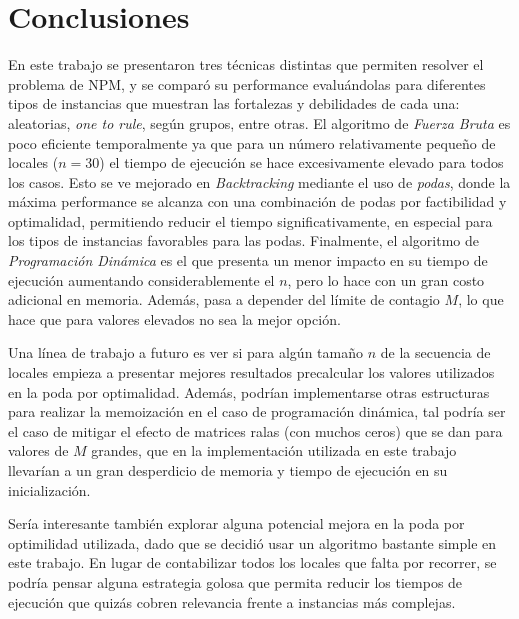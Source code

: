 \section{Conclusiones}

En este trabajo se presentaron tres técnicas distintas que permiten resolver el problema de NPM, y se comparó su performance evaluándolas para diferentes tipos de instancias que muestran las fortalezas y debilidades de cada una: aleatorias, \textit{one to rule}, según grupos, entre otras. El algoritmo de \textit{Fuerza Bruta} es poco eficiente temporalmente ya que para un número relativamente pequeño de locales ($n=30$) el tiempo de ejecución se hace excesivamente elevado para todos los casos. Esto se ve mejorado en \textit{Backtracking} mediante el uso de \textit{podas}, donde la máxima performance se alcanza con una combinación de podas por factibilidad y optimalidad, permitiendo reducir el tiempo significativamente, en especial para los tipos de instancias favorables para las podas. Finalmente, el algoritmo de \textit{Programación Dinámica} es el que presenta un menor impacto en su tiempo de ejecución aumentando considerablemente el $n$, pero lo hace con un gran costo adicional en memoria. Además, pasa a depender del límite de contagio $M$, lo que hace que para valores elevados no sea la mejor opción.

Una línea de trabajo a futuro es ver si para algún tamaño $n$ de la secuencia de locales empieza a presentar mejores resultados precalcular los valores utilizados en la poda por optimalidad. Además, podrían implementarse otras estructuras para realizar la memoización en el caso de programación dinámica, tal podría ser el caso de mitigar el efecto de matrices ralas (con muchos ceros) que se dan para valores de $M$ grandes, que en la implementación utilizada en este trabajo llevarían a un gran desperdicio de memoria y tiempo de ejecución en su inicialización. 

Sería interesante también explorar alguna potencial mejora en la poda por optimilidad utilizada, dado que se decidió usar un algoritmo bastante simple en este trabajo. En lugar de contabilizar todos los locales que falta por recorrer, se podría pensar alguna estrategia golosa que permita reducir los tiempos de ejecución que quizás cobren relevancia frente a instancias más complejas.